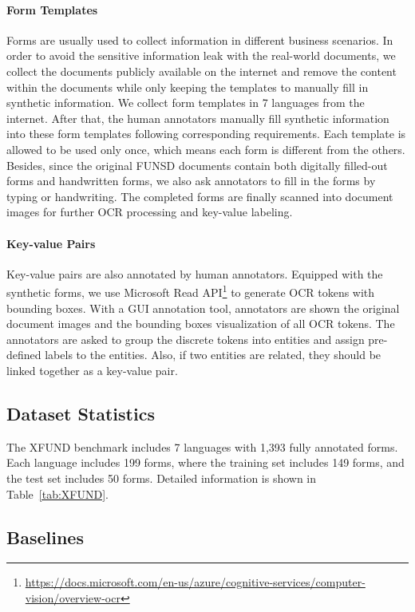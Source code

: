 \documentclass[11pt]{article}
\newcommand{\task}{\textsc{XFUND}\xspace}
\begin{document}
\paragraph{Form Templates}
Forms are usually used to collect information in different business scenarios. In order to avoid the sensitive information leak with the real-world documents, we collect the documents publicly available on the internet and remove the content within the documents while only keeping the templates to manually fill in synthetic information. We collect form templates in 7 languages from the internet. After that, the human annotators manually fill synthetic information into these form templates following corresponding requirements. Each template is allowed to be used only once, which means each form is different from the others. Besides, since the original FUNSD documents contain both digitally filled-out forms and handwritten forms, we also ask annotators to fill in the forms by typing or handwriting. The completed forms are finally scanned into document images for further OCR processing and key-value labeling.

\paragraph{Key-value Pairs}
Key-value pairs are also annotated by human annotators. Equipped with the synthetic forms, we use Microsoft Read API\footnote{\url{https://docs.microsoft.com/en-us/azure/cognitive-services/computer-vision/overview-ocr}} to generate OCR tokens with bounding boxes. With a GUI annotation tool, annotators are shown the original document images and the bounding boxes visualization of all OCR tokens. The annotators are asked to group the discrete tokens into entities and assign pre-defined labels to the entities. Also, if two entities are related, they should be linked together as a key-value pair.

\subsection{Dataset Statistics}
The \task benchmark includes 7 languages with 1,393 fully annotated forms. Each language includes 199 forms, where the training set includes 149 forms, and the test set includes 50 forms. Detailed information is shown in Table~\ref{tab:XFUND}.


\subsection{Baselines}
\end{document}
